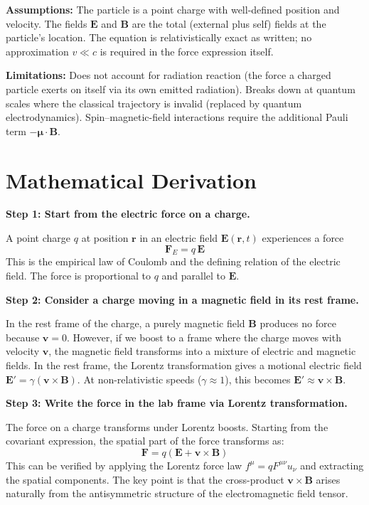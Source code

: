 \textbf{Assumptions:} The particle is a point charge with well-defined position and velocity. The fields $\mathbf{E}$ and $\mathbf{B}$ are the total (external plus self) fields at the particle's location. The equation is relativistically exact as written; no approximation $v \ll c$ is required in the force expression itself.


\textbf{Limitations:} Does not account for radiation reaction (the force a charged particle exerts on itself via its own emitted radiation). Breaks down at quantum scales where the classical trajectory is invalid (replaced by quantum electrodynamics). Spin--magnetic-field interactions require the additional Pauli term $-\boldsymbol{\mu} \cdot \mathbf{B}$.


\section*{Mathematical Derivation}

\textbf{Step 1: Start from the electric force on a charge.}

A point charge $q$ at position $\mathbf{r}$ in an electric field $\mathbf{E}(\mathbf{r},t)$ experiences a force
\begin{equation}
\mathbf{F}_E = q\,\mathbf{E}
\end{equation}
This is the empirical law of Coulomb and the defining relation of the electric field. The force is proportional to $q$ and parallel to $\mathbf{E}$.

\textbf{Step 2: Consider a charge moving in a magnetic field in its rest frame.}

In the rest frame of the charge, a purely magnetic field $\mathbf{B}$ produces no force because $\mathbf{v} = 0$. However, if we boost to a frame where the charge moves with velocity $\mathbf{v}$, the magnetic field transforms into a mixture of electric and magnetic fields. In the rest frame, the Lorentz transformation gives a motional electric field $\mathbf{E}' = \gamma(\mathbf{v}\times\mathbf{B})$. At non-relativistic speeds ($\gamma \approx 1$), this becomes $\mathbf{E}' \approx \mathbf{v}\times\mathbf{B}$.

\textbf{Step 3: Write the force in the lab frame via Lorentz transformation.}

The force on a charge transforms under Lorentz boosts. Starting from the covariant expression, the spatial part of the force transforms as:
\begin{equation}
\mathbf{F} = q(\mathbf{E} + \mathbf{v}\times\mathbf{B})
\end{equation}
This can be verified by applying the Lorentz force law $f^\mu = qF^{\mu\nu}u_\nu$ and extracting the spatial components. The key point is that the cross-product $\mathbf{v}\times\mathbf{B}$ arises naturally from the antisymmetric structure of the electromagnetic field tensor.

